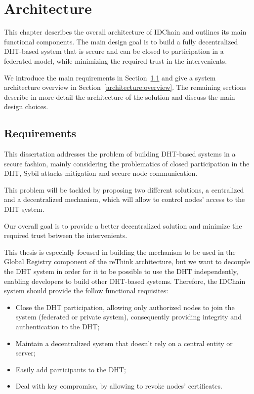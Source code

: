\chapter{Architecture}
\label{chapter:architecture}

This chapter describes the overall architecture of IDChain and outlines its main functional components.
The main design goal is to build a fully decentralized DHT-based system that is secure and can be closed to participation in a federated model, while minimizing the required trust in the intervenients.

We introduce the main requirements in Section~\ref{architecture:requirements} and give a system architecture overview in Section~\ref{architecture:overview}.
The remaining sections describe in more detail the architecture of the solution and discuss the main design choices.

\section{Requirements}\label{architecture:requirements}

This dissertation addresses the problem of building DHT-based systems in a secure fashion, mainly considering the problematics of closed participation in the DHT, Sybil attacks mitigation and secure node communication.

This problem will be tackled by proposing two different solutions, a centralized and a decentralized mechanism, which will allow to control nodes' access to the DHT system.

Our overall goal is to provide a better decentralized solution and minimize the required trust between the intervenients.

This thesis is especially focused in building the mechanism to be used in the Global Registry component of the reThink architecture, but we want to decouple the DHT system in order for it to be possible to use the DHT independently, enabling developers to build other DHT-based systems.
Therefore, the IDChain system should provide the follow functional requisites:

\begin{itemize}
  \item Close the DHT participation, allowing only authorized nodes to join the system (federated or private system), consequently providing integrity and authentication to the DHT;
  \item Maintain a decentralized system that doesn't rely on a central entity or server;
  \item Easily add participants to the DHT;
  \item Deal with key compromise, by allowing to revoke nodes' certificates.
\end{itemize}

